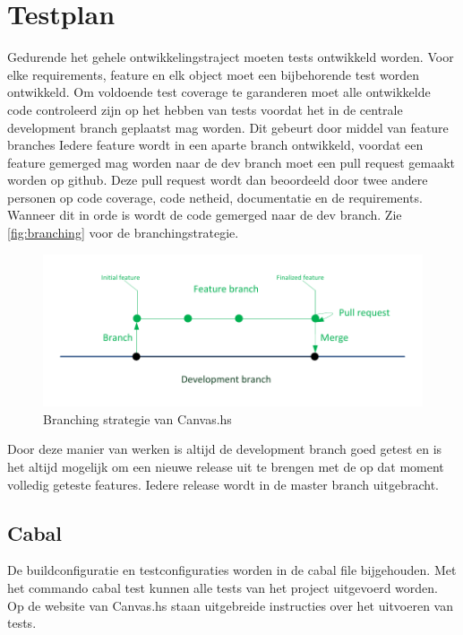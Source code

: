 \section{Testplan} \label{sec:testplan}
Gedurende het gehele ontwikkelingstraject moeten tests ontwikkeld worden. Voor elke requirements, feature en elk object moet een bijbehorende test worden ontwikkeld. Om voldoende test coverage te garanderen moet alle ontwikkelde code controleerd zijn op het hebben van tests voordat het in de centrale development branch geplaatst mag worden. Dit gebeurt door middel van feature branches  Iedere feature wordt in een aparte branch ontwikkeld, voordat een feature gemerged mag worden naar de dev branch moet een pull request gemaakt worden op github. Deze pull request wordt dan beoordeeld door twee andere personen op code coverage, code netheid, documentatie en de requirements. Wanneer dit in orde is wordt de code gemerged naar de dev branch. Zie  \autoref{fig:branching} voor de branchingstrategie.

\begin{figure}
\begin{center}
\includegraphics[keepaspectratio,width=\textwidth]{./images/branching.pdf}
\caption{Branching strategie van Canvas.hs}
\label{fig:branching}
\end{center}
\end{figure}

Door deze manier van werken is altijd de development branch goed getest en is het altijd mogelijk om een nieuwe release uit te brengen met de op dat moment volledig geteste features. Iedere release wordt in de master branch uitgebracht.

\subsection{Cabal}
De buildconfiguratie en testconfiguraties worden in de cabal file bijgehouden. Met het commando cabal test kunnen alle tests van het project uitgevoerd worden. Op de website van Canvas.hs staan uitgebreide instructies over het uitvoeren van tests.

